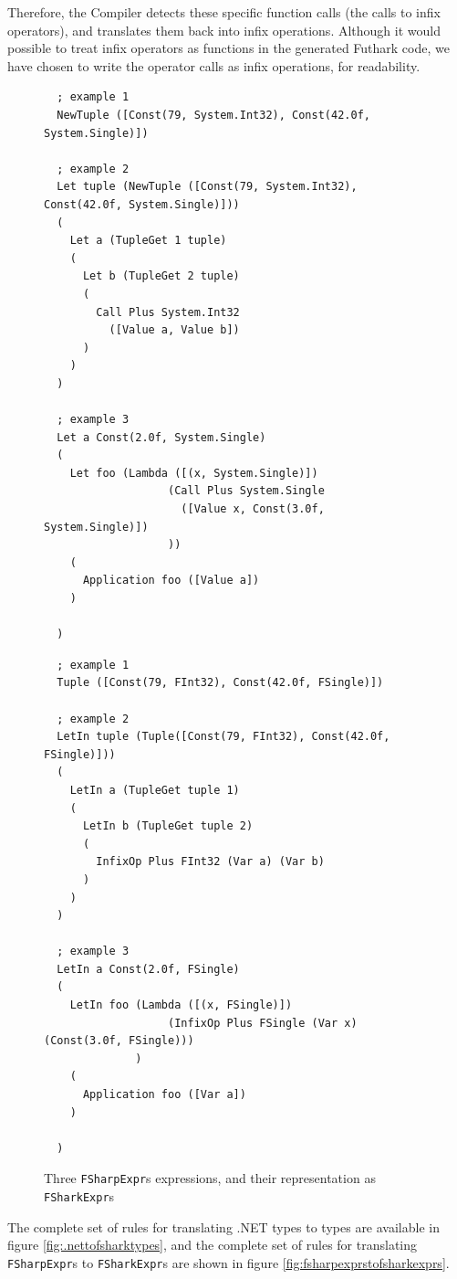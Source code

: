 Therefore, the \fshark{}Compiler detects these specific function calls (the calls to infix operators), and 
translates them back into infix operations.
Although it would possible to treat infix operators as functions in the
\fshark{} generated Futhark code, we have chosen to write the
operator calls as infix operations, for readability.

\begin{figure}[H]
  \centering
\begin{verbatim}
  ; example 1
  NewTuple ([Const(79, System.Int32), Const(42.0f, System.Single)])

  ; example 2
  Let tuple (NewTuple ([Const(79, System.Int32), Const(42.0f, System.Single)]))
  ( 
    Let a (TupleGet 1 tuple) 
    (
      Let b (TupleGet 2 tuple) 
      (
        Call Plus System.Int32 
          ([Value a, Value b])
      )       
    )
  )

  ; example 3
  Let a Const(2.0f, System.Single)
  (
    Let foo (Lambda ([(x, System.Single)]) 
                   (Call Plus System.Single 
                     ([Value x, Const(3.0f, System.Single)])
                   ))
    (
      Application foo ([Value a])
    )

  )
\end{verbatim}
\begin{verbatim}
  ; example 1
  Tuple ([Const(79, FInt32), Const(42.0f, FSingle)])

  ; example 2
  LetIn tuple (Tuple([Const(79, FInt32), Const(42.0f, FSingle)]))
  ( 
    LetIn a (TupleGet tuple 1) 
    (
      LetIn b (TupleGet tuple 2) 
      (
        InfixOp Plus FInt32 (Var a) (Var b)
      )       
    )
  )

  ; example 3
  LetIn a Const(2.0f, FSingle)
  (
    LetIn foo (Lambda ([(x, FSingle)]) 
                   (InfixOp Plus FSingle (Var x) (Const(3.0f, FSingle)))
              )
    (
      Application foo ([Var a])
    )

  )
\end{verbatim}
  \caption{Three \texttt{FSharpExpr}s expressions, and their representation as \texttt{FSharkExpr}s}
  \label{fig:fsharpexprs2}
\end{figure}

The complete set of rules for translating .NET types to \fshark{} types are
available in figure \ref{fig:.nettofsharktypes}, and the complete set of rules
for translating \texttt{FSharpExpr}s to \texttt{FSharkExpr}s are shown in figure \ref{fig:fsharpexprstofsharkexprs}.

